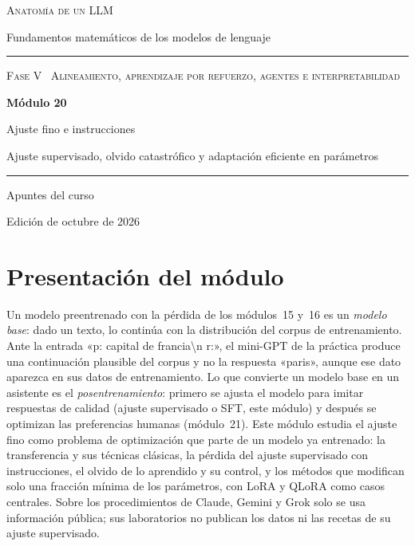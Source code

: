 \documentclass[11pt,a4paper,twoside,openany]{book}
\begin{document}
\frontmatter
\begin{titlepage}
\centering
\vspace*{2.5cm}
{\large\scshape Anatomía de un LLM}\par
\vspace{0.4cm}
{\normalsize Fundamentos matemáticos de los modelos de lenguaje}\par
\vspace{2.2cm}
\rule{\textwidth}{0.8pt}\par\vspace{0.5cm}
{\small\scshape Fase V \textperiodcentered\ Alineamiento, aprendizaje por refuerzo, agentes e interpretabilidad}\par\vspace{0.3cm}
{\Huge\bfseries Módulo 20\par}\vspace{0.3cm}
{\LARGE Ajuste fino e instrucciones\par}
\vspace{0.2cm}
{\large Ajuste supervisado, olvido catastrófico y adaptación eficiente en parámetros\par}
\vspace{0.5cm}\rule{\textwidth}{0.4pt}\par
\vspace{1.6cm}
{\large Apuntes del curso}\par
\vfill
{\small Edición de octubre de 2026}\par
\end{titlepage}

\chapter*{Presentación del módulo}

Un modelo preentrenado con la pérdida de los módulos~15 y~16 es un \emph{modelo base}: dado un texto, lo continúa con la distribución del corpus de entrenamiento. Ante la entrada «p: capital de francia\textbackslash n r:», el mini-GPT de la práctica produce una continuación plausible del corpus y no la respuesta «paris», aunque ese dato aparezca en sus datos de entrenamiento. Lo que convierte un modelo base en un asistente es el \emph{posentrenamiento}: primero se ajusta el modelo para imitar respuestas de calidad (ajuste supervisado o SFT, este módulo) y después se optimizan las preferencias humanas (módulo~21). Este módulo estudia el ajuste fino como problema de optimización que parte de un modelo ya entrenado: la transferencia y sus técnicas clásicas, la pérdida del ajuste supervisado con instrucciones, el olvido de lo aprendido y su control, y los métodos que modifican solo una fracción mínima de los parámetros, con LoRA y QLoRA como casos centrales. Sobre los procedimientos de Claude, Gemini y Grok solo se usa información pública; sus laboratorios no publican los datos ni las recetas de su ajuste supervisado.
\end{document}
